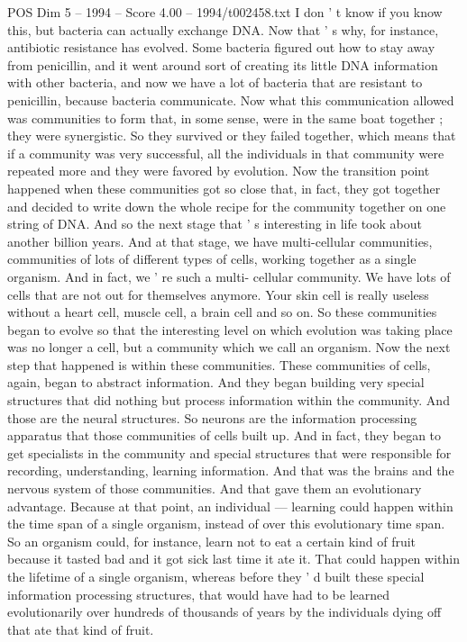 \begin{textsample}{POS Dim 5 – 1994 – Score 4.00 – 1994/t002458.txt}
I don ' t know if you know this, but bacteria can actually exchange DNA.
Now that ' s why, for instance, antibiotic resistance has evolved.
Some bacteria figured out how to stay away from penicillin, and it went around sort of creating its little DNA information with other bacteria, and now we have a lot of bacteria that are resistant to penicillin, because bacteria communicate.
Now what this communication allowed was communities to form that, in some sense, were in the same boat together ; they were synergistic.
So they survived or they failed together, which means that if a community was very successful, all the individuals in that community were repeated more and they were favored by evolution.
Now the transition point happened when these communities got so close that, in fact, they got together and decided to write down the whole recipe for the community together on one string of DNA.
And so the next stage that ' s interesting in life took about another billion years.
And at that stage, we have multi-cellular communities, communities of lots of different types of cells, working together as a single organism.
And in fact, we ' re such a multi- cellular community.
We have lots of cells that are not out for themselves anymore.
Your skin cell is really useless without a heart cell, muscle cell, a brain cell and so on.
So these communities began to evolve so that the interesting level on which evolution was taking place was no longer a cell, but a community which we call an organism.
Now the next step that happened is within these communities.
These communities of cells, again, began to abstract information.
And they began building very special structures that did nothing but process information within the community.
And those are the neural structures.
So neurons are the information processing apparatus that those communities of cells built up.
And in fact, they began to get specialists in the community and special structures that were responsible for recording, understanding, learning information.
And that was the brains and the nervous system of those communities.
And that gave them an evolutionary advantage.
Because at that point, an individual — learning could happen within the time span of a single organism, instead of over this evolutionary time span.
So an organism could, for instance, learn not to eat a certain kind of fruit because it tasted bad and it got sick last time it ate it.
That could happen within the lifetime of a single organism, whereas before they ' d built these special information processing structures, that would have had to be learned evolutionarily over hundreds of thousands of years by the individuals dying off that ate that kind of fruit.

\end{textsample}

